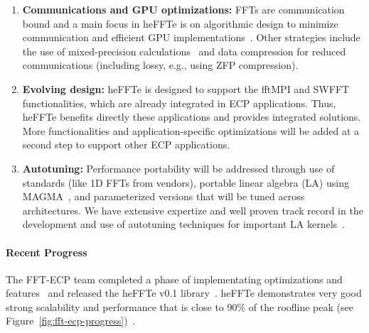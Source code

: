 \begin{enumerate}
\item
\textbf{Communications and GPU optimizations:}
FFTs are communication bound and a main focus in heFFTe is on algorithmic
design to minimize communication and efficient GPU implementations~\cite{eurompi19}.
Other strategies include the use of mixed-precision calculations~\cite{Haidar2018,tcfft18}
and data compression for reduced communications (including lossy, e.g., using ZFP compression).
\item
\textbf{Evolving design:}
heFFTe is designed to support the fftMPI and SWFFT functionalities,
which are already integrated in ECP applications. Thus, heFFTe benefits
directly these applications and provides integrated solutions. 
More functionalities and application-specific optimizations will be added 
at a second step to support other ECP applications. 
\item
\textbf{Autotuning:}
Performance portability will be addressed through use of standards (like 1D FFTs 
from vendors), portable linear algebra (LA) using MAGMA~\cite{Tomov_2010_pcsa}, 
and parameterized versions that will be tuned across architectures. We have extensive 
expertize and well proven track record in the development and use of autotuning techniques 
for important LA kernels~\cite{Nath2010,Kurzak2012gemmfermi}. 
\end{enumerate}

\paragraph{Recent Progress}
The FFT-ECP team completed a phase of implementating optimizations and features~\cite{thasd19}
and released the heFFTe v0.1 library~\cite{sc19}. heFFTe demonstrates very good strong 
scalability and performance that is close to 90\% of the roofline peak 
(see Figure~\ref{fig:fft-ecp-progress})~\cite{sc19,eurompi19}.



